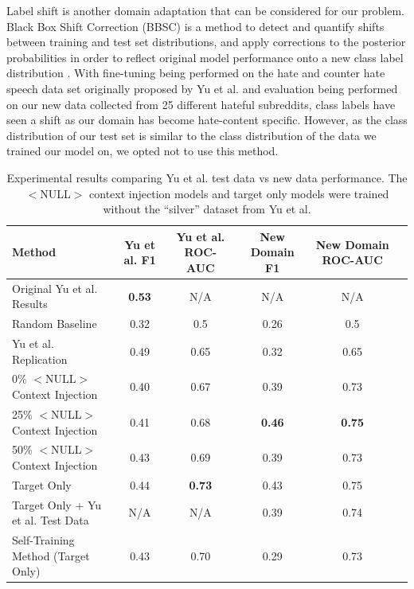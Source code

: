 \documentclass[10pt,twocolumn,letterpaper]{article}
\begin{document}
Label shift is another domain adaptation that can be considered for our problem. Black Box Shift Correction (BBSC) is a method to detect and quantify shifts between training and test set distributions, and apply corrections to the posterior probabilities in order to reflect original model performance onto a new class label distribution \cite{bbsc-lipton}. With fine-tuning being performed on the hate and counter hate speech data set originally proposed by Yu et al. \cite{yu-etal-2022-hate} and evaluation being performed on our new data collected from 25 different hateful subreddits, class labels have seen a shift as our domain has become hate-content specific. However, as the class distribution of our test set is similar to the class distribution of the data we trained our model on, we opted not to use this method.


\begin{table}[t]
  \centering
  \begin{tabular}{ l c c c c c }
    \toprule
    Method & Yu et al. F1 & Yu et al. ROC-AUC & New Domain F1 & New Domain ROC-AUC  \\
    \midrule
    Original Yu et al. Results \cite{yu-etal-2022-hate} & \textbf{0.53} & N/A & N/A & N/A \\
    Random Baseline & 0.32 & 0.5 & 0.26 & 0.5 \\
    Yu et al. Replication & 0.49 & 0.65 & 0.32 & 0.65 \\
    0\% $<$NULL$>$ Context Injection & 0.40 & 0.67 & 0.39 & 0.73 \\
    25\% $<$NULL$>$ Context Injection & 0.41 & 0.68 & \textbf{0.46} & \textbf{0.75} \\
    50\% $<$NULL$>$ Context Injection & 0.43 & 0.69 & 0.39 & 0.73 \\
    Target Only & 0.44 & \textbf{0.73} & 0.43 & 0.75 \\
    Target Only + Yu et al. Test Data & N/A & N/A & 0.39 & 0.74 \\
    Self-Training Method (Target Only) & 0.43  & 0.70  & 0.29 & 0.73 \\
    \bottomrule
  \end{tabular}
  \caption{Experimental results comparing Yu et al. test data vs new data performance. The $<$NULL$>$ context injection models and target only models were trained without the ``silver'' dataset from Yu et al.}
  \label{tab:example}
\end{table}
\end{document}
